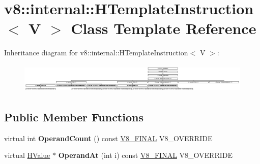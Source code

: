 \hypertarget{classv8_1_1internal_1_1_h_template_instruction}{}\section{v8\+:\+:internal\+:\+:H\+Template\+Instruction$<$ V $>$ Class Template Reference}
\label{classv8_1_1internal_1_1_h_template_instruction}
Inheritance diagram for v8\+:\+:internal\+:\+:H\+Template\+Instruction$<$ V $>$\+:\begin{figure}[H]
\begin{center}
\leavevmode
\includegraphics[height=1.428571cm]{classv8_1_1internal_1_1_h_template_instruction}
\end{center}
\end{figure}
\subsection*{Public Member Functions}
\begin{DoxyCompactItemize}
\item 
\hypertarget{classv8_1_1internal_1_1_h_template_instruction_ac95a245de362469ac7688e3a386e880c}{}virtual int {\bfseries Operand\+Count} () const \hyperlink{classv8_1_1internal_1_1_v8___f_i_n_a_l}{V8\+\_\+\+F\+I\+N\+A\+L} V8\+\_\+\+O\+V\+E\+R\+R\+I\+D\+E\label{classv8_1_1internal_1_1_h_template_instruction_ac95a245de362469ac7688e3a386e880c}

\item 
\hypertarget{classv8_1_1internal_1_1_h_template_instruction_a5369db94382a635dce9d3020a4e74c61}{}virtual \hyperlink{classv8_1_1internal_1_1_h_value}{H\+Value} $\ast$ {\bfseries Operand\+At} (int i) const \hyperlink{classv8_1_1internal_1_1_v8___f_i_n_a_l}{V8\+\_\+\+F\+I\+N\+A\+L} V8\+\_\+\+O\+V\+E\+R\+R\+I\+D\+E\label{classv8_1_1internal_1_1_h_template_instruction_a5369db94382a635dce9d3020a4e74c61}

\end{DoxyCompactItemize}
